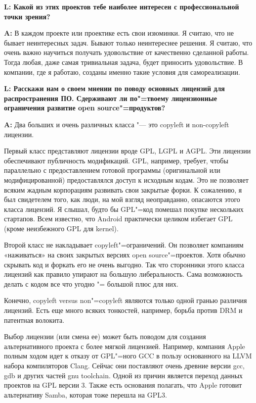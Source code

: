 \documentclass[10pt, a5paper]{article}
\begin{document}
{\noindent \bf L:  Какой из этих проектов тебе наиболее интересен с профессиональной точки зрения?}

{\noindent \bf A:} В каждом проекте или проектике есть свои изюминки. Я считаю, что не бывает неинтересных задач. Бывают только неинтереснее решения. Я считаю, что очень важно научиться получать удовольствие от качественно сделанной работы. Тогда любая, даже самая тривиальная задача, будет приносить удовольствие. В компании, где я работаю, созданы именно такие условия для самореализации.

{\noindent \bf L:  Расскажи нам о своем мнении по поводу основных лицензий для распространения ПО. Сдерживают ли по"=твоему лицензионные ограничения развитие open source"=продуктов?}

{\noindent \bf A:} Два больших и очень различных класса "--- это copyleft и non-copyleft лицензии.

Первый класс представляют лицензии вроде GPL, LGPL и AGPL. Эти лицензии обеспечивают публичность модификаций. GPL, например, требует, чтобы параллельно с предоставлением готовой программы (оригинальной или модифицированной) предоставлялся доступ к исходным кодам. Это не позволяет всяким жадным корпорациям развивать свои закрытые форки. К сожалению, я был свидетелем того, как люди,  на мой взгляд неоправданно, опасаются этого класса лицензий. Я слышал, будто бы GPL"=код помешал покупке нескольких стартапов. Всем известно, что Android практически целиком избегает GPL (кроме неизбежного GPL для kernel).

Второй класс не накладывает copyleft"=ограничений. Он позволяет компаниям «наживаться» на своих закрытых версиях open source"=проектов. Хотя обычно скрывать код и форкать его не очень выгодно. Так что сторонники этого класса лицензий как правило упирают на большую либеральность. Сама возможность делать с кодом все что угодно "= большой плюс для них.

Конечно, copyleft versus non"=copyleft являются только одной гранью различия лицензий. Есть еще много всяких тонкостей, например, борьба против DRM и патентная волокита.

Выбор лицензии (или смена ее) может быть поводом для создания альтернативного проекта с более мягкой лицензией. Например, компания Apple полным ходом идет к отказу от GPL"=ного GCC в пользу основанного на LLVM набора компиляторов Clang. Сейчас они поставляют очень древние версии gcc, gdb и других частей gnu toolchain. Одной из причин является переход данных проектов на GPL версии 3. Также есть основания полагать, что Apple готовит альтернативу Samba, которая тоже перешла на GPL3.
\end{document}
